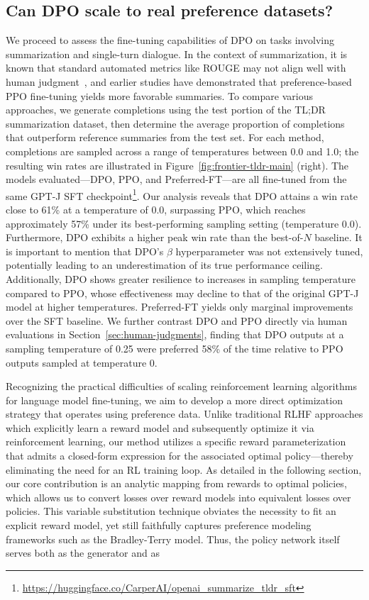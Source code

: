 \subsection{Can DPO scale to real preference datasets?}
\label{sec:dpo-real-datasets}
We proceed to assess the fine-tuning capabilities of DPO on tasks involving summarization and single-turn dialogue. In the context of summarization, it is known that standard automated metrics like ROUGE may not align well with human judgment~\citep{stiennon2022learning}, and earlier studies have demonstrated that preference-based PPO fine-tuning yields more favorable summaries. To compare various approaches, we generate completions using the test portion of the TL;DR summarization dataset, then determine the average proportion of completions that outperform reference summaries from the test set. For each method, completions are sampled across a range of temperatures between 0.0 and 1.0; the resulting win rates are illustrated in Figure~\ref{fig:frontier-tldr-main} (right). The models evaluated—DPO, PPO, and Preferred-FT—are all fine-tuned from the same GPT-J SFT checkpoint\footnote{\url{https://huggingface.co/CarperAI/openai_summarize_tldr_sft}}. Our analysis reveals that DPO attains a win rate close to 61\% at a temperature of 0.0, surpassing PPO, which reaches approximately 57\% under its best-performing sampling setting (temperature 0.0). Furthermore, DPO exhibits a higher peak win rate than the best-of-$N$ baseline. It is important to mention that DPO’s $\beta$ hyperparameter was not extensively tuned, potentially leading to an underestimation of its true performance ceiling. Additionally, DPO shows greater resilience to increases in sampling temperature compared to PPO, whose effectiveness may decline to that of the original GPT-J model at higher temperatures. Preferred-FT yields only marginal improvements over the SFT baseline. We further contrast DPO and PPO directly via human evaluations in Section~\ref{sec:human-judgments}, finding that DPO outputs at a sampling temperature of 0.25 were preferred 58\% of the time relative to PPO outputs sampled at temperature 0.

Recognizing the practical difficulties of scaling reinforcement learning algorithms for language model fine-tuning, we aim to develop a more direct optimization strategy that operates using preference data. Unlike traditional RLHF approaches which explicitly learn a reward model and subsequently optimize it via reinforcement learning, our method utilizes a specific reward parameterization that admits a closed-form expression for the associated optimal policy—thereby eliminating the need for an RL training loop. As detailed in the following section, our core contribution is an analytic mapping from rewards to optimal policies, which allows us to convert losses over reward models into equivalent losses over policies. This variable substitution technique obviates the necessity to fit an explicit reward model, yet still faithfully captures preference modeling frameworks such as the Bradley-Terry model. Thus, the policy network itself serves both as the generator and as

